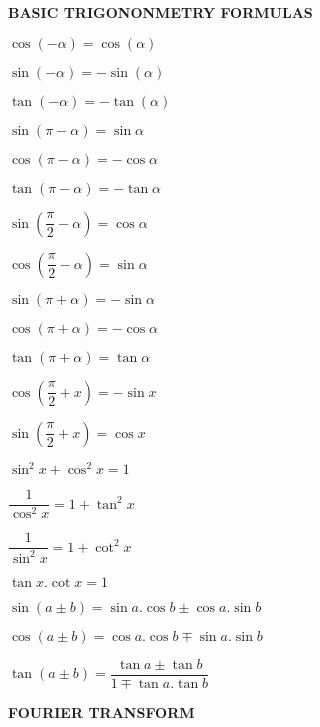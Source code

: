 \begin{center}
    \textbf{BASIC TRIGONONMETRY FORMULAS}
\end{center}
\begin{multicols}{2}
$\cos(-\alpha) = \cos(\alpha)$

$\sin(-\alpha) = -\sin(\alpha)$

$\tan(-\alpha) = -\tan(\alpha)$

$\sin(\pi - \alpha) = \sin \alpha$

$\cos(\pi - \alpha) = -\cos \alpha$

$\tan(\pi - \alpha) = -\tan \alpha$

$\sin\left(\dfrac{\pi}{2}-\alpha \right)=\cos \alpha$

$\cos\left(\dfrac{\pi}{2}-\alpha \right)=\sin \alpha$

$\sin(\pi + \alpha) = -\sin \alpha$

$\cos(\pi + \alpha) = -\cos \alpha$

$\tan (\pi + \alpha) = \tan \alpha$

$\cos\left(\dfrac{\pi}{2}+x \right)=-\sin x$

$\sin\left(\dfrac{\pi}{2}+x \right)=\cos x$

$\sin^2 x + \cos^2 x = 1$

$\dfrac{1}{\cos^2 x}= 1+\tan^2 x$

$\dfrac{1}{\sin^2 x}= 1+\cot^2 x$

$\tan x. \cot x = 1$

$\sin(a \pm b) = \sin a.\cos b \pm \cos a.\sin b$

$\cos(a\pm b)=\cos a.\cos b \mp \sin a.\sin b$

$\tan(a\pm b) = \dfrac{\tan a \pm \tan b}{1 \mp \tan a.\tan b}$
\end{multicols}

\begin{center}
    \textbf{FOURIER TRANSFORM}
\end{center}